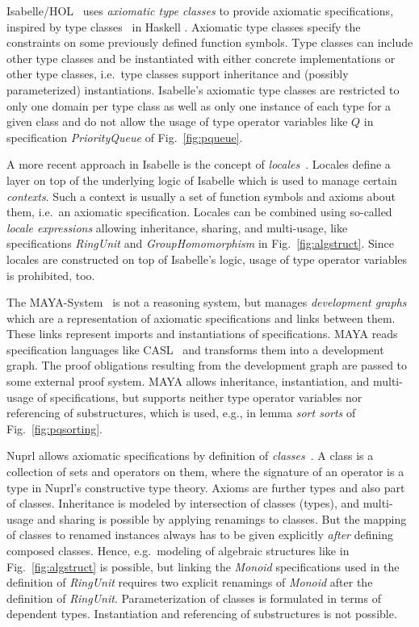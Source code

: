 \documentclass{article}
\theoremstyle{remark}
\theoremstyle{definition}
\begin{document}
Isabelle/HOL~\cite{NPW:Isabelle} uses \emph{axiomatic type classes} to provide axiomatic specifications, inspired by
type classes~\cite{HHJL:TypeClassesHaskell} in Haskell%
. Axiomatic type classes specify the constraints on some previously defined function symbols. Type classes can include
other type classes and be instantiated with either concrete implementations or other type classes, i.e.\ type classes
support inheritance and (possibly parameterized) instantiations. Isabelle's axiomatic type classes are restricted to
only one domain per type class as well as only one instance of each type for a given class and do not allow the usage
of type operator variables like $Q$ in specification \emph{PriorityQueue} of Fig.~\ref{fig:pqueue}.

A more recent approach in Isabelle is the concept of \emph{locales}~\cite{B:Locales}. Locales define a layer on top of
the underlying logic of Isabelle which is used to manage certain \emph{contexts}. Such a context is usually a set of
function symbols and axioms about them, i.e.\ an axiomatic specification. Locales can be combined using so-called
\emph{locale expressions} allowing inheritance, sharing, and multi-usage, like specifications \emph{RingUnit} and
\emph{GroupHomomorphism} in Fig.~\ref{fig:algstruct}. Since locales are constructed on top of Isabelle's logic, usage
of type operator variables is prohibited, too.

The MAYA-System~\cite{AHMS:DevelopmentGraph} is not a reasoning system, but manages \emph{development graphs} which are
a representation of axiomatic specifications and links between them. These links represent imports and instantiations
of specifications. MAYA reads specification languages like CASL~\cite{ABK:CASL} and transforms them into a development
graph. The proof obligations resulting from the development graph are passed to some external proof system. MAYA allows
inheritance, instantiation, and multi-usage of specifications, but supports neither type operator variables nor
referencing of substructures, which is used, e.g., in lemma \emph{sort sorts} of Fig.~\ref{fig:pqsorting}.

Nuprl allows axiomatic specifications by definition of \emph{classes}~\cite{CH:NuprlClass}. A class is a collection of
sets and operators on them, where the signature of an operator is a type in Nuprl's constructive type theory. Axioms
are further types and also part of classes. Inheritance is modeled by intersection of classes (types), and multi-usage
and sharing is possible by applying renamings to classes. But the mapping of classes to renamed instances always has to
be given explicitly \emph{after} defining composed classes. Hence, e.g.\ modeling of algebraic structures like in
Fig.~\ref{fig:algstruct} is possible, but linking the \emph{Monoid} specifications used in the definition of
\emph{RingUnit} requires two explicit renamings of \emph{Monoid} after the definition of \emph{RingUnit}.
Parameterization of classes is formulated in terms of dependent types. Instantiation and referencing of substructures
is not possible.
\end{document}

